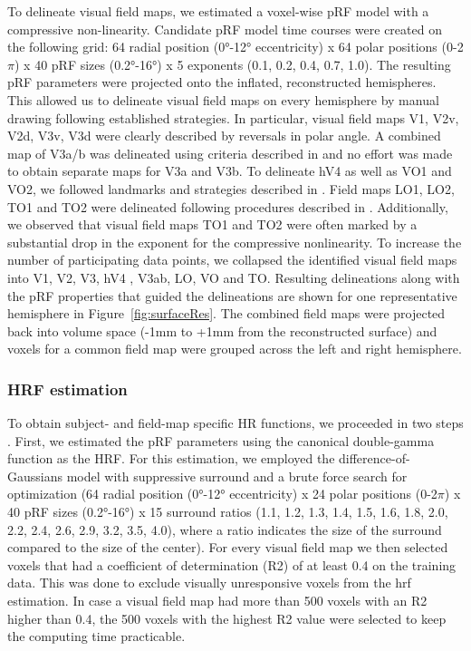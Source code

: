 To delineate visual field maps, we estimated a voxel-wise pRF model with a compressive non-linearity. Candidate pRF model time courses were created on the following grid: 64 radial position (0°-12° eccentricity) x 64 polar positions (0-2$\pi$) x 40 pRF sizes (0.2°-16°) x 5 exponents (0.1, 0.2, 0.4, 0.7, 1.0). The resulting pRF parameters were projected onto the inflated, reconstructed hemispheres. This allowed us to delineate visual field maps on every hemisphere by manual drawing following established strategies. In particular, visual field maps V1, V2v, V2d, V3v, V3d were clearly described by reversals in polar angle. A combined map of V3a/b was delineated using criteria described in \cite{Wandell2005, Larsson2006} and no effort was made to obtain separate maps for V3a and V3b. To delineate hV4 as well as VO1 and VO2, we followed landmarks and strategies described in \cite{Winawer2017}. Field maps LO1, LO2, TO1 and TO2 were delineated following procedures described in \cite{Amano2009}. Additionally, we observed that visual field maps TO1 and TO2 were often marked by a substantial drop in the exponent for the compressive nonlinearity. To increase the number of participating data points, we collapsed the identified visual field maps into V1, V2, V3, hV4 \parencite{Winawer2010}, V3ab, LO, VO and TO. Resulting delineations along with the pRF properties that guided the delineations are shown for one representative hemisphere in Figure~\ref{fig:surfaceRes}. The combined field maps were projected back into volume space (-1mm to +1mm from the reconstructed surface) and voxels for a common field map were grouped across the left and right hemisphere.

\subsubsection{HRF estimation}
To obtain subject- and field-map specific HR functions, we proceeded in two steps \parencite{Harvey2011, Harvey2015, Harvey2016}. First, we estimated the pRF parameters using the canonical double-gamma function \parencite{Friston1998} as the HRF. For this estimation, we employed the difference-of-Gaussians model with suppressive surround and a brute force search for optimization (64 radial position (0°-12° eccentricity) x 24 polar positions (0-2$\pi$) x 40 pRF sizes (0.2°-16°) x 15 surround ratios (1.1, 1.2, 1.3, 1.4, 1.5, 1.6, 1.8, 2.0, 2.2, 2.4, 2.6, 2.9, 3.2, 3.5, 4.0), where a ratio indicates the size of the surround compared to the size of the center). For every visual field map we then selected voxels that had a coefficient of determination (R2) of at least 0.4 on the training data. This was done to exclude visually unresponsive voxels from the hrf estimation. In case a visual field map had more than 500 voxels with an R2 higher than 0.4, the 500 voxels with the highest R2 value were selected to keep the computing time practicable.

